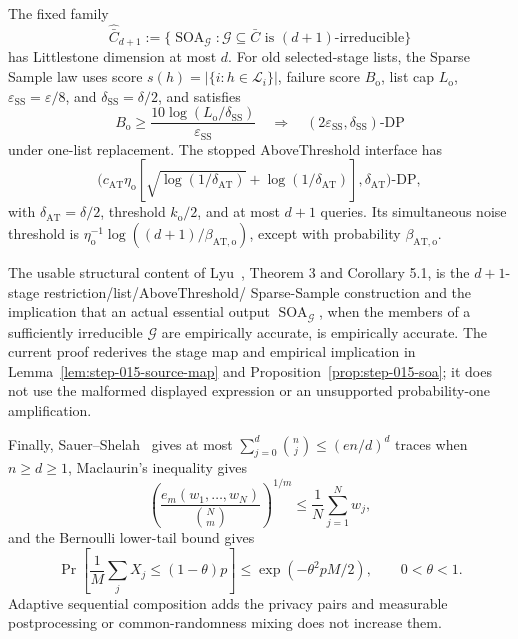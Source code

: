 \begin{proposition}
The fixed family
\[
 \widehat{\bar C}_{d+1}:=
 \{\operatorname{SOA}_{\mathcal G}:\mathcal G\subseteq\bar C
       \text{ is }(d+1)\text{-irreducible}\}
 \tag{C3}
\]
has Littlestone dimension at most \(d\).  For old selected-stage lists,
the Sparse Sample law uses score \(s(h)=|\{i:h\in\mathcal L_i\}|\), failure
score \(B_{\mathrm o}\), list cap \(L_{\mathrm o}\),
\(\varepsilon_{\mathrm{SS}}=\varepsilon/8\), and
\(\delta_{\mathrm{SS}}=\delta/2\), and satisfies
\[
 B_{\mathrm o}\geq
 \frac{10\log(L_{\mathrm o}/\delta_{\mathrm{SS}})}
      {\varepsilon_{\mathrm{SS}}}
 \quad\Longrightarrow\quad
 (2\varepsilon_{\mathrm{SS}},\delta_{\mathrm{SS}})\text{-DP}
 \tag{C4}
\]
under one-list replacement.  The stopped AboveThreshold interface has
\[
 \bigl(c_{\mathrm{AT}}\eta_{\mathrm o}
 [\sqrt{\log(1/\delta_{\mathrm{AT}})}+\log(1/\delta_{\mathrm{AT}})],
 \delta_{\mathrm{AT}}\bigr)\text{-DP},
 \tag{C5}
\]
with \(\delta_{\mathrm{AT}}=\delta/2\), threshold \(k_{\mathrm o}/2\), and
at most \(d+1\) queries.  Its simultaneous noise threshold is
\(\eta_{\mathrm o}^{-1}\log((d+1)/\beta_{\mathrm{AT,o}})\), except with
probability \(\beta_{\mathrm{AT,o}}\).

The usable structural content of Lyu~\citep{lyu2025}, Theorem 3 and
Corollary 5.1, is the \(d+1\)-stage restriction/list/AboveThreshold/
Sparse-Sample construction and the implication that an actual essential
output \(\operatorname{SOA}_{\mathcal G}\), when the members of a sufficiently
irreducible \(\mathcal G\) are empirically accurate, is empirically accurate.
The current proof rederives the stage map and empirical implication in
Lemma~\ref{lem:step-015-source-map} and Proposition~\ref{prop:step-015-soa};
it does not use the malformed displayed expression or an unsupported
probability-one amplification.

Finally, Sauer--Shelah~\citep{sauer1972} gives at most
\(\sum_{j=0}^d\binom nj\le(en/d)^d\) traces when \(n\ge d\ge1\),
Maclaurin's inequality gives
\[
 \left(\frac{e_m(w_1,\ldots,w_N)}{\binom Nm}\right)^{1/m}
 \le\frac1N\sum_{j=1}^Nw_j,
 \tag{C6}
\]
and the Bernoulli lower-tail bound gives
\[
 \Pr\!\left[\frac1M\sum_jX_j\le(1-\theta)p\right]
 \le\exp(-\theta^2pM/2),
 \qquad 0<\theta<1.
 \tag{C7}
\]
Adaptive sequential composition adds the privacy pairs and measurable
postprocessing or common-randomness mixing does not increase them.
\end{proposition}

